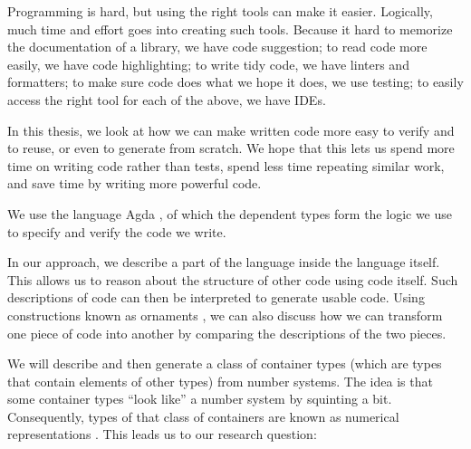 \begin{outline}
Programming is hard, but using the right tools can make it easier. Logically, much time and effort goes into creating such tools. Because it hard to memorize the documentation of a library, we have code suggestion; to read code more easily, we have code highlighting; to write tidy code, we have linters and formatters; to make sure code does what we hope it does, we use testing; to easily access the right tool for each of the above, we have IDEs. 

In this thesis, we look at how we can make written code more easy to verify and to reuse, or even to generate from scratch. We hope that this lets us spend more time on writing code rather than tests, spend less time repeating similar work, and save time by writing more powerful code.

We use the language Agda \cite{agda}, of which the dependent types form the logic we use to specify and verify the code we write.
\end{outline}

\begin{outline}
In our approach, we describe a part of the language inside the language itself. This allows us to reason about the structure of other code using code itself. Such descriptions of code can then be interpreted to generate usable code. Using constructions known as ornaments \cite{algorn, sijsling}, we can also discuss how we can transform one piece of code into another by comparing the descriptions of the two pieces.
\end{outline}

We will describe and then generate a class of container types (which are types that contain elements of other types) from number systems. The idea is that some container types ``look like'' a number system by squinting a bit. Consequently, types of that class of containers are known as numerical representations \cite{purelyfunctional}. This leads us to our research question:


